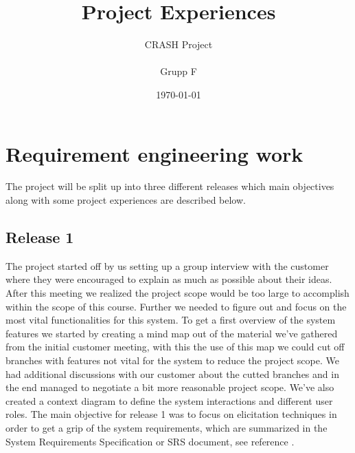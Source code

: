 \documentclass[10pt]{article}
\title{Project Experiences}
\author{CRASH Project
\\
\\ Grupp F}
\date{\today}
\begin{document}
\begin{titlepage}
\clearpage
  \maketitle
\thispagestyle{empty}

\end{titlepage}


\tableofcontents
\thispagestyle{empty}
\newpage
{}

\section{Requirement engineering work}
\noindent The project will be split up into three different releases which main objectives along with some project experiences are described below.
\subsection{Release 1}
The project started off by us setting up a group interview with the customer where they were encouraged to explain as much as possible about their ideas. After this meeting we realized the project scope would be too large to accomplish within the scope of this course. Further we needed to figure out and focus on the most vital functionalities for this system.
To get a first overview of the system features we started by creating a mind map out of the material we've gathered from the initial customer meeting, with this the use of this map we could cut off branches with features not vital for the system to reduce the project scope.
We had additional discussions with our customer about the cutted branches and in the end managed to negotiate a bit more reasonable project scope.
\newline We've also created a context diagram to define the system interactions and different user roles.
The main objective for release 1 was to focus on elicitation techniques in order to get a grip of the system requirements, which are summarized in the System Requirements Specification or SRS document, see reference \cite{srs}.

\end{document}
